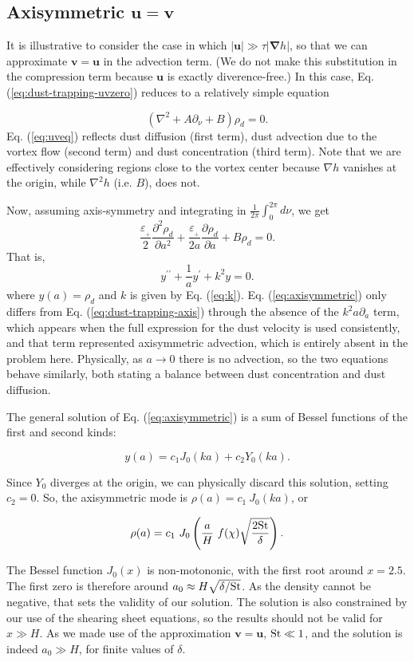\documentclass[apj]{emulateapj}
\newcommand{\pderiv}[2]{\frac{\partial #1}{\partial #2}}
\newcommand{\pderivn}[3]{\frac{\partial^{#3} #1}{\partial #2^{#3}}}
\renewcommand{\v}[1]{{\boldsymbol{#1}}} %
\newcommand{\del}{\v{\nabla}}
\newcommand{\grad}{\del}
\newcommand{\Laplace}{\nabla^2}
\newcommand{\Eq}[1]{Eq. (\ref{#1})}
\newcommand{\eq}[1]{\Eq{#1}}
\newcommand{\beq}{\begin{equation}}
\newcommand{\eeq}{\end{equation}}
\newcommand{\epsp}{\varepsilon_{_{+}}}
\begin{document}
\subsection{Axisymmetric $\v{u} = \v{v}$ }
It is illustrative to consider the case in which $|\v{u}| \gg \tau|\grad{h}|$,
so that we can approximate $\v{v}=\v{u}$ in the advection term. (We do
not make this substitution in the compression term because $\v{u}$ is
exactly diverence-free.) In this case, \eq{eq:dust-trapping-uvzero} reduces
to a relatively simple equation 

\beq\label{eq:uveq}
\left(\Laplace{} + A\partial_\nu + B \right)\rho_d = 0. 
\eeq
\eq{eq:uveq} reflects dust diffusion (first term), dust advection due
to the vortex flow (second term) and dust concentration (third term). 
Note that we are effectively considering regions close to the vortex
center because $\nabla h$ vanishes at the origin, while $\nabla^2h$
(i.e. $B$), does not.   

Now, assuming axis-symmetry and integrating in
$\frac{1}{2\pi} \int_0^{2\pi} d\nu$, we get  
\beq
\frac{\epsp}{2}\pderivn{\rho_d}{a}{2} +
\frac{\epsp}{2a}\pderiv{\rho_d}{a} + B \rho_d = 0.  
\eeq
That is, 
\beq
y^{\prime\prime} + \frac{1}{a}y^\prime + k^2 y = 0. 
\label{eq:axisymmetric}
\eeq where $y(a) = \rho_d$ and $k$ is given by \eq{eq:k}. 
\eq{eq:axisymmetric} only differs from \eq{eq:dust-trapping-axis} through the
absence of the $k^2a\partial_a$ term, which appears when the full
expression for the dust velocity is used consistently, and that term represented
axisymmetric advection, which is entirely absent in the 
problem here. Physically, as $a\to0$ there is no advection, so the two
equations behave similarly, both stating a balance between dust
concentration and dust diffusion. 

The general solution of \eq{eq:axisymmetric} is a
sum of Bessel functions of the first and second kinds: 

\beq
y(a) = c_1 J_0 (ka) + c_2 Y_0(ka). 
\eeq

\noindent Since  $Y_0$ diverges at the origin, we can physically discard 
this solution, setting $c_2=0$. So, the axisymmetric mode is $\rho(a)
= c_1 \ J_0 (ka)$, or

\beq
\rho(a) = c_1 \ J_0 \left(\frac{a}{H} \ f(\chi) \sqrt{\frac{2{\rm St}}{\delta}}\right).
\eeq 

The Bessel function $J_0(x)$ is
non-motononic, with the first root around $x=2.5$. The first zero is therefore around
$a_0 \approx H \sqrt{\delta/{\rm St}}$.  As the density
cannot be negative, that sets the validity of our solution. 
The solution is also constrained by our use of the shearing sheet
equations, so the results should not be valid for $x \gg H$.
As we made use of the approximation $\v{v}=\v{u}$, ${\rm St} \ll 1$,
and the solution  is indeed $a_0 \gg H$, for finite values of $\delta$.
\end{document}
